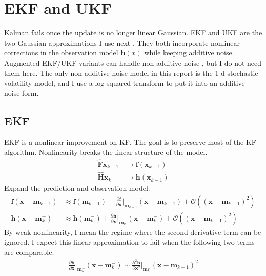 \documentclass{article}
\begin{document}
\newpage
\section{EKF and UKF}

Kalman fails once the update is no longer linear Gaussian. EKF and UKF are the two Gaussian approximations I use next \cite{Särkkä2013BayesianFilteringAndSmoothing}. They both incorporate nonlinear corrections in the observation model $\mathbf{h}(x)$ while keeping additive noise. Augmented EKF/UKF variants can handle non-additive noise \cite{Särkkä2013BayesianFilteringAndSmoothing}, but I do not need them here. The only non-additive noise model in this report is the 1-d stochastic volatility model, and I use a log-squared transform to put it into an additive-noise form.

\subsection{EKF}
EKF is a nonlinear improvement on KF. The goal is to preserve most of the KF algorithm. Nonlinearity breaks the linear structure of the model.
\begin{equation}
\begin{split}
\mathbf{\hat F} \mathbf{x}_{k-1}  &\rightarrow \mathbf{f}(\mathbf{x}_{k-1})  \\
\mathbf{\hat H} \mathbf{x}_{k}  &\rightarrow \mathbf{h}(\mathbf{x}_{k-1})
\end{split}
\end{equation}
Expand the prediction and observation model:
\begin{equation}
\begin{split}
\mathbf{f}(\mathbf{ x} -\mathbf{ m}_{k-1}) &\approx \mathbf{f}(\mathbf{ m}_{k-1}) + \frac{\partial \mathbf{f}}{\partial \mathbf{x}}\Big|_{\mathbf{m}_{k-1}} (\mathbf{x}-\mathbf{ m }_{k-1}) +\mathcal{O} ((\mathbf{x}-\mathbf{ m }_{k-1})^2 ) \\
\mathbf{h}(\mathbf{ x} -\mathbf{ m}^-_{k}) &\approx \mathbf{h}(\mathbf{ m}^-_{k}) + \frac{\partial \mathbf{h}}{\partial \mathbf{x}}\Big|_{\mathbf{m}^-_{k}} (\mathbf{x}-\mathbf{ m }^-_{k}) +\mathcal{O} ((\mathbf{x}-\mathbf{ m }_{k-1})^2 ) 
\end{split}
\end{equation}
By weak nonlinearity, I mean the regime where the second derivative term can be ignored. I expect this linear approximation to fail when the following two terms are comparable.
\begin{equation}
\begin{split}
\frac{\partial \mathbf{h}}{\partial \mathbf{x}}\Big|_{\mathbf{m}^-_{k}} (\mathbf{x}-\mathbf{ m }^-_{k}) \sim \frac{\partial^2 \mathbf{h}}{\partial \mathbf{x}^2}|_{\mathbf{m}^-_{k}} (\mathbf{x}-\mathbf{ m }_{k-1})^2 
\end{split}
\end{equation}
\end{document}
